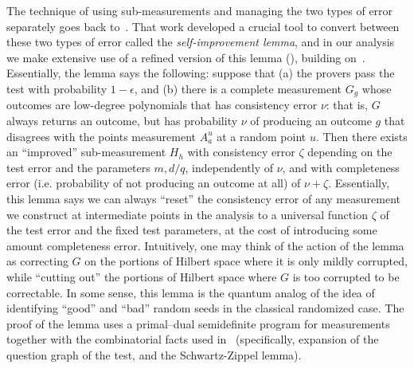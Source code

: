 \documentclass[11pt]{article}
\theoremstyle{definition}
\newcommand{\eps}{\epsilon}
\begin{document}
The technique of using sub-measurements and managing the two types of
error separately goes back to~\cite{IV12}. That work developed a
crucial tool to convert between these two types of error called the
\emph{self-improvement lemma}, and in our analysis we make extensive
use of a refined version of this lemma (), building on~\cite{Vid16,NV18b}. Essentially, the lemma says the
following: suppose that (a) the provers pass the test with probability
$1 - \eps$, and (b) there is a complete measurement $G_{g}$ whose
outcomes are low-degree polynomials that has
consistency error $\nu$: that is, $G$ always returns an outcome, but
has probability $\nu$ of producing an outcome $g$ that disagrees with the points measurement $A^u_a$ at a
random point $u$. Then there exists an
``improved'' sub-measurement  $H_{h}$ with consistency error $\zeta$
depending on the test error and the parameters $m,d/q$, independently
of $\nu$, and with completeness error
(i.e. probability of not producing an outcome at all) of $\nu
+\zeta$. Essentially, this lemma says we can always ``reset'' the
consistency error of any measurement we construct at intermediate
points in the analysis to a universal
function $\zeta$ of the test error and the fixed test parameters,
at the cost of introducing some amount completeness error. Intuitively, one may
think of the action of the lemma as correcting $G$ on the portions of
Hilbert space where it is only mildly corrupted, while ``cutting out'' the
portions of Hilbert space where $G$ is too corrupted to be
correctable. In some sense, this lemma is the quantum analog of the
idea of identifying ``good'' and ``bad'' random seeds in the classical
randomized case. The proof of the lemma uses a primal--dual semidefinite program for measurements
together with the combinatorial facts used in~\cite{BFL91}
(specifically, expansion of the question graph of the test, and
the Schwartz-Zippel lemma).
\end{document}
